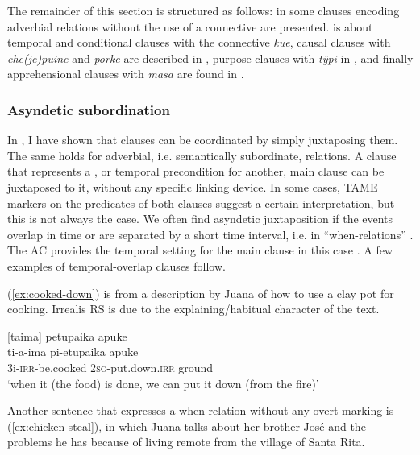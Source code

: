 The remainder of this section is structured as follows: in  some clauses encoding adverbial relations without the use of a connective are presented.  is about temporal and conditional clauses with the connective \textit{kue}, causal clauses with \textit{che(je)puine} and \textit{porke} are described in , purpose clauses with \textit{tÿpi} in , and finally apprehensional clauses with \textit{masa} are found in . 

\subsubsection{Asyndetic subordination}\label{sec:AsyndeticSubordination}

In , I have shown that clauses can be coordinated by simply juxtaposing them. The same holds for adverbial, i.e. semantically subordinate, relations. A clause that represents a ,  or temporal precondition for another, main clause can be juxtaposed to it, without any specific linking device. In some cases, TAME markers on the predicates of both clauses suggest a certain interpretation, but this is not always the case. We often find asyndetic juxtaposition if the events overlap in time or are separated by a short time interval, i.e. in “when-relations” \citep[159]{Cristofaro2003}. The AC provides the temporal setting for the main clause in this case \citep[cf.][155]{Cristofaro2003}. A few examples of temporal-overlap clauses follow.

(\ref{ex:cooked-down}) is from a description by Juana of how to use a clay pot for cooking. Irrealis RS is due to the explaining/habitual character of the text.

\ea\label{ex:cooked-down}
\begingl
\glpreamble \textup{[}taima\textup{]} petupaika apuke\\
\gla ti-a-ima pi-etupaika apuke\\
\glb 3i-\textsc{irr}-be.cooked 2\textsc{sg}-put.down.\textsc{irr} ground\\
\glft ‘when it (the food) is done, we can put it down (from the fire)’
\endgl
\trailingcitation{[jxx-d110923l-3.5]}
\xe

Another sentence that expresses a when-relation without any overt marking is (\ref{ex:chicken-steal}), in which Juana talks about her brother José and the problems he has because of living remote from the village of Santa Rita. 

